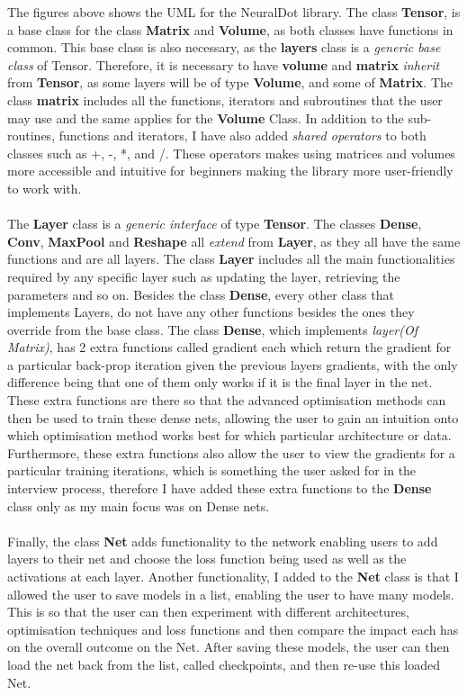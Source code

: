 The figures above shows the UML for the NeuralDot library. The class \textbf{Tensor}, is a base class for the class \textbf{Matrix} and \textbf{Volume}, as both classes have functions in common. This base class is also necessary, as the \textbf{layers} class is a \textit{generic base class} of Tensor. Therefore, it is necessary to have \textbf{volume} and \textbf{matrix} \textit{inherit} from \textbf{Tensor}, as some layers will be of type \textbf{Volume}, and some of \textbf{Matrix}. The class \textbf{matrix} includes all the functions, iterators and subroutines that the user may use and the same applies for the \textbf{Volume} Class. In addition to the sub-routines, functions and iterators, I have also added \textit{shared operators} to both classes such as +, -, *, and /. These operators makes using matrices and volumes more accessible and intuitive for beginners making the library more user-friendly to work with.
\\ \\
The \textbf{Layer} class is a \textit{generic interface} of type \textbf{Tensor}. The classes \textbf{Dense}, \textbf{Conv}, \textbf{MaxPool} and \textbf{Reshape} all \textit{extend} from \textbf{Layer}, as they all have the same functions and are all layers. The class \textbf{Layer} includes all the main functionalities required by any specific layer such as updating the layer, retrieving the parameters and so on. Besides the class \textbf{Dense}, every other class that implements Layers, do not have any other functions besides the ones they override from the base class. The class \textbf{Dense}, which implements \textit{layer(Of Matrix)}, has 2 extra functions called gradient each which return the gradient for a particular back-prop iteration given the previous layers gradients, with the only difference being that one of them only works if it is the final layer in the net. These extra functions are there so that the advanced optimisation methods can then be used to train these dense nets, allowing the user to gain an intuition onto which optimisation method works best for which particular architecture or data. Furthermore, these extra functions also allow the user to view the gradients for a particular training iterations, which is something the user asked for in the interview process, therefore I have added these extra functions to the \textbf{Dense} class only as my main focus was on Dense nets.
\\ \\
Finally, the class \textbf{Net} adds functionality to the network enabling users to add layers to their net and choose the loss function being used as well as the activations at each layer. Another functionality, I added to the \textbf{Net} class is that I allowed the user to save models in a list, enabling the user to have many models. This is so that the user can then experiment with different architectures, optimisation techniques and loss functions and then compare the impact each has on the overall outcome on the Net. After saving these models, the user can then load the net back from the list, called checkpoints, and then re-use this loaded Net.
